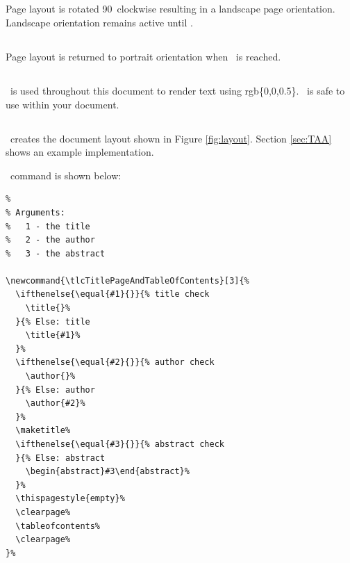 \documentclass[12pt]{tlc-article}
\begin{document}
\subsection{\tlcBL}
Page layout is rotated 90\textdegree\ clockwise resulting in a landscape page
orientation.  Landscape orientation remains active until \tlcEL.


\subsection{\tlcEL}
Page layout is returned to portrait orientation when \tlcEL\ is reached.


\subsection{\tlcDB}
\tlcDB\ is used throughout this document to render text using rgb\{0,0,0.5\}.
\tlcDB\ is safe to use within your document.


\subsection{\tlcTOC}
\tlcTOC\ creates the document layout shown in Figure \ref{fig:layout}.  Section
\ref{sec:TAA} shows an example implementation.

\tlcVspace

\tlcTOC\ command is shown below:

\begin{lstlisting}[basicstyle=\ttfamily\tiny]
% Each document uses the same author name, title page and table of contents.
%
% Arguments:
%   1 - the title
%   2 - the author
%   3 - the abstract

\newcommand{\tlcTitlePageAndTableOfContents}[3]{%
  \ifthenelse{\equal{#1}{}}{% title check
    \title{}%
  }{% Else: title
    \title{#1}%
  }%
  \ifthenelse{\equal{#2}{}}{% author check
    \author{}%
  }{% Else: author
    \author{#2}%
  }%
  \maketitle%
  \ifthenelse{\equal{#3}{}}{% abstract check
  }{% Else: abstract
    \begin{abstract}#3\end{abstract}%
  }%
  \thispagestyle{empty}%
  \clearpage%
  \tableofcontents%
  \clearpage%
}%

\end{lstlisting}
\end{document}

